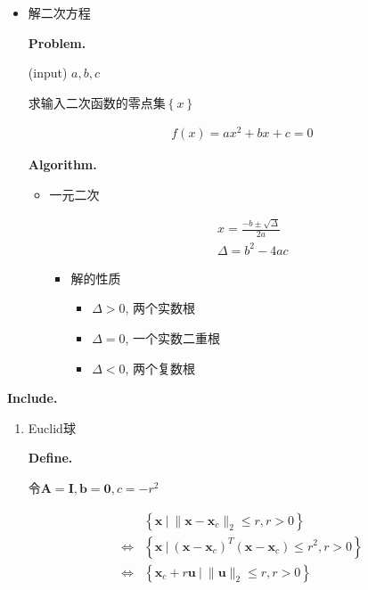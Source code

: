 \documentclass{article}
\begin{document}
\begin{enumerate}
\begin{enumerate}
\begin{enumerate}
					\begin{itemize}
					\item 解二次方程\par
						\textbf{Problem. }\par
							(input) $a, b, c$\par
							求输入二次函数的零点集$\left\{x\right\}$\par
							\begin{align*}f\left(x\right) = a x^2 + b x + c = 0\end{align*}

						\textbf{Algorithm. }\par
							\begin{itemize}
							\item 一元二次\par
								\begin{align*}
x = \frac{- b \pm \sqrt{\Delta }}{2 a}\\
\Delta  = b^2 - 4 a c
\end{align*}

								\begin{itemize}
								\item 解的性质\par
									\begin{itemize}
									\item $\Delta  > 0$, 两个实数根\par
									\item $\Delta  = 0$, 一个实数二重根\par
									\item $\Delta  < 0$, 两个复数根\par
									\end{itemize}
								\end{itemize}
							\end{itemize}
					\end{itemize}
					\textbf{Include. }\par
						\begin{enumerate}\par
						\item Euclid球\par
							\textbf{Define. }\par
								令$\boldsymbol A = \boldsymbol I, \boldsymbol b = \boldsymbol 0, c = -r^2$\par
								\begin{align*}
&\left\{ \boldsymbol x \ |\ \| \boldsymbol x - \boldsymbol x_c\| _2 \le  r, r>0\right\}\\
\Leftrightarrow &\left\{ \boldsymbol x \ |\ \left(\boldsymbol x - \boldsymbol x_c\right)^T \left(\boldsymbol x - \boldsymbol x_c\right) \le  r^2, r>0\right\}  \tag{等价}\\
\Leftrightarrow &\left\{ \boldsymbol x_c + r \boldsymbol u \ |\ \| \boldsymbol u\| _2 \le  r, r>0\right\}  \tag{等价}
\end{align*}


\end{enumerate}
\end{enumerate}
\end{enumerate}
\end{enumerate}
\end{document}
